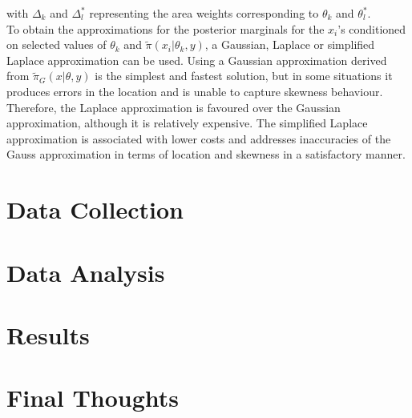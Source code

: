 \documentclass[12pt]{book}
\begin{document}
with $\Delta_k$ and $\Delta_l^*$ representing the area weights corresponding to $\theta_k$ and $\theta_l^*$. \\
To obtain the approximations for the posterior marginals for the $x_i$'s conditioned on selected values of $\theta_k$ and $\widetilde{\pi}\left(x_i|\theta_k,y\right)$, a Gaussian, Laplace or simplified Laplace approximation can be used. Using a Gaussian approximation derived from $\widetilde{\pi}_G\left(x|\theta,y\right)$ is the simplest and fastest solution, but in some situations it produces errors in the location and is unable to capture skewness behaviour. Therefore, the Laplace approximation is favoured over the Gaussian approximation, although it is relatively expensive. The simplified Laplace approximation is associated with lower costs and addresses inaccuracies of the Gauss approximation in terms of location and skewness in a satisfactory manner. \autocite[Cf.][]{moraga2019geospatial}
\chapter{Data Collection}
\chapter{Data Analysis}
\chapter{Results}
\chapter{Final Thoughts}
\end{document}
